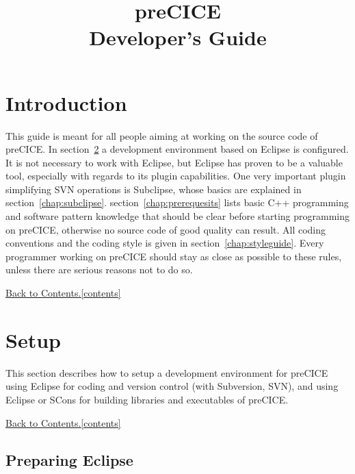 \documentclass[11pt, oneside]{scrartcl}
\title{\Large{preCICE} \\[5mm] \Huge{Developer's Guide}}
\newcommand{\backtocontents}{\hyperref[contents]{Back to Contents.\ref*{contents}}}
\begin{document}

\maketitle
\tableofcontents \label{contents}


\section{Introduction} 

This guide is meant for all people aiming at working on the source code of
preCICE. In section~\ref{chap:setup} a development environment based on Eclipse
is configured. It is not necessary to work with Eclipse, but Eclipse has proven
to be a valuable tool, especially with regards to its plugin capabilities. One
very important plugin simplifying SVN operations is Subclipse, whose basics are
explained in section~\ref{chap:subclipse}. section~\ref{chap:prerequesits} lists
basic C++ programming and software pattern knowledge that should be clear before
starting programming on preCICE, otherwise no source code of good quality can
result. All coding conventions and the coding style is given in
section~\ref{chap:styleguide}. Every programmer working on preCICE should stay
as close as possible to these rules, unless there are serious reasons not to do
so.

\backtocontents


\section{Setup} \label{chap:setup}

This section describes how to setup a development environment for preCICE using
Eclipse for coding and version control (with Subversion, SVN), and using Eclipse
or SCons for building libraries and executables of preCICE.

\backtocontents    
    
    
\subsection{Preparing Eclipse}
   
\end{document}
